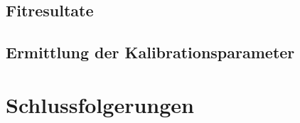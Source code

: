 \subsection{Fitresultate}


\subsection{Ermittlung der Kalibrationsparameter}


\section{Schlussfolgerungen}

